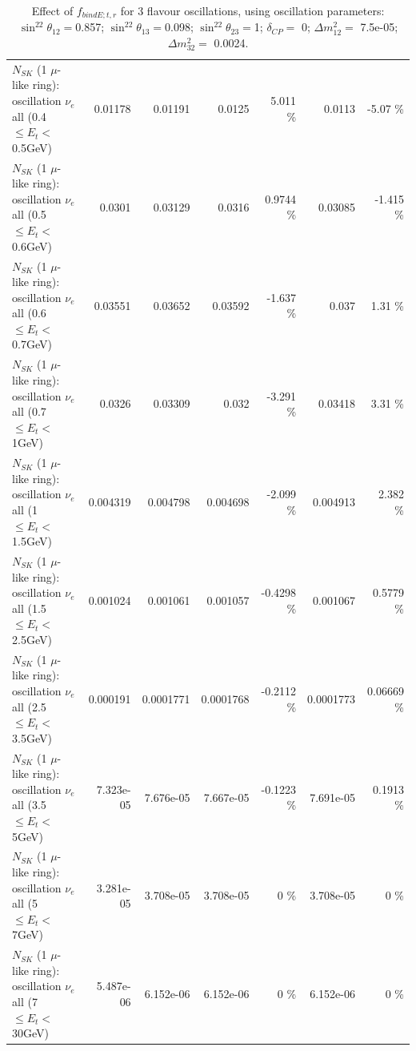 \begin{table}
\begin{tabular}{| l | r | r | r  r | r  r |}
$N_{SK}$ (1 $\mu$-like ring): oscillation $\nu_{e}$ all (0.4 $\leq E_{t} <$ 0.5GeV) &         0.01178 &         0.01191 &          0.0125 &    5.011 \%  &          0.0113 &    -5.07 \%  \\ 
$N_{SK}$ (1 $\mu$-like ring): oscillation $\nu_{e}$ all (0.5 $\leq E_{t} <$ 0.6GeV) &          0.0301 &         0.03129 &          0.0316 &   0.9744 \%  &         0.03085 &   -1.415 \%  \\ 
$N_{SK}$ (1 $\mu$-like ring): oscillation $\nu_{e}$ all (0.6 $\leq E_{t} <$ 0.7GeV) &         0.03551 &         0.03652 &         0.03592 &   -1.637 \%  &           0.037 &     1.31 \%  \\ 
$N_{SK}$ (1 $\mu$-like ring): oscillation $\nu_{e}$ all (0.7 $\leq E_{t} <$ 1GeV) &          0.0326 &         0.03309 &           0.032 &   -3.291 \%  &         0.03418 &     3.31 \%  \\ 
$N_{SK}$ (1 $\mu$-like ring): oscillation $\nu_{e}$ all (1 $\leq E_{t} <$ 1.5GeV) &        0.004319 &        0.004798 &        0.004698 &   -2.099 \%  &        0.004913 &    2.382 \%  \\ 
$N_{SK}$ (1 $\mu$-like ring): oscillation $\nu_{e}$ all (1.5 $\leq E_{t} <$ 2.5GeV) &        0.001024 &        0.001061 &        0.001057 &  -0.4298 \%  &        0.001067 &   0.5779 \%  \\ 
$N_{SK}$ (1 $\mu$-like ring): oscillation $\nu_{e}$ all (2.5 $\leq E_{t} <$ 3.5GeV) &        0.000191 &       0.0001771 &       0.0001768 &  -0.2112 \%  &       0.0001773 &  0.06669 \%  \\ 
$N_{SK}$ (1 $\mu$-like ring): oscillation $\nu_{e}$ all (3.5 $\leq E_{t} <$ 5GeV) &       7.323e-05 &       7.676e-05 &       7.667e-05 &  -0.1223 \%  &       7.691e-05 &   0.1913 \%  \\ 
 $N_{SK}$ (1 $\mu$-like ring): oscillation $\nu_{e}$ all (5 $\leq E_{t} <$ 7GeV) &       3.281e-05 &       3.708e-05 &       3.708e-05 &        0 \%  &       3.708e-05 &        0 \%  \\ 
$N_{SK}$ (1 $\mu$-like ring): oscillation $\nu_{e}$ all (7 $\leq E_{t} <$ 30GeV) &       5.487e-06 &       6.152e-06 &       6.152e-06 &        0 \%  &       6.152e-06 &        0 \%  \\ 
\hline
\hline
\end{tabular}
\caption{ Effect of $f_{bindE; t, r}$ for 3 flavour oscillations, using oscillation parameters:  $\sin^22\theta_{12} = $0.857; $\sin^22\theta_{13} = $0.098; $\sin^22\theta_{23} = $1; $\delta_{CP} = $        0; $\Delta m^2_{12} = $    7.5e-05; $\Delta m^2_{32} = $    0.0024. }
\label{tab:num_xsec_bindE_1RmuT_3f_osc_t13:0.098}
\end{table}
